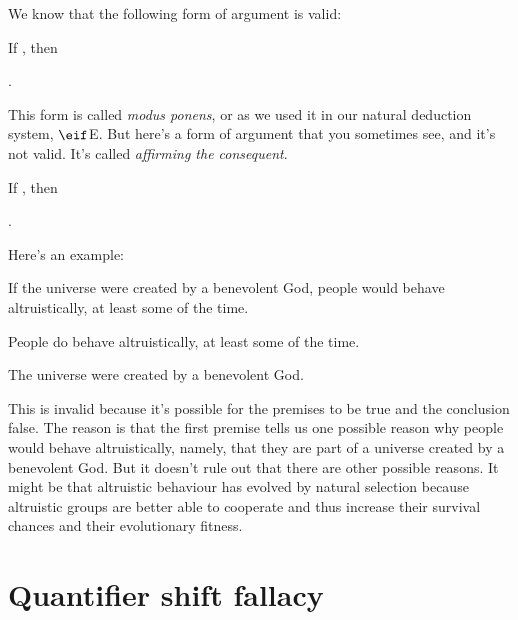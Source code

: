 We know that the following form of argument is valid:
\begin{earg}
\prem If \metaX, then \metaY

\prem \metaX

\conc \metaY.
\end{earg}
This form is called \emph{modus ponens}, or as we used it in our natural deduction system, $\eif$E. But here's a form of argument that you sometimes see, and it's not valid. It's called \emph{affirming the consequent}.
\begin{earg}
\prem If \metaX, then \metaY

\prem \metaY

\conc \metaX.
\end{earg}
Here's an example:
\begin{earg}
\prem If the universe were created by a benevolent God, people would behave altruistically, at least some of the time.

\prem People do behave altruistically, at least some of the time.

\conc The universe were created by a benevolent God.
\end{earg}
This is invalid because it's possible for the premises to be true and the conclusion false. The reason is that the first premise tells us one possible reason why people would behave altruistically, namely, that they are part of a universe created by a benevolent God. But it doesn't rule out that there are other possible reasons. It might be that altruistic behaviour has evolved by natural selection because altruistic groups are better able to cooperate and thus increase their survival chances and their evolutionary fitness.


\section{Quantifier shift fallacy}

